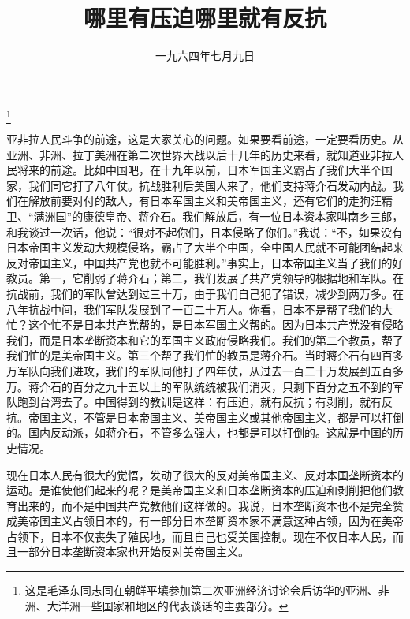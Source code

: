 
\title{哪里有压迫哪里就有反抗}
\date{一九六四年七月九日}
\thanks{这是毛泽东同志同在朝鲜平壤参加第二次亚洲经济讨论会后访华的亚洲、非洲、大洋洲一些国家和地区的代表谈话的主要部分。}
\maketitle


亚非拉人民斗争的前途，这是大家关心的问题。如果要看前途，一定要看历史。从亚洲、非洲、拉丁美洲在第二次世界大战以后十几年的历史来看，就知道亚非拉人民将来的前途。比如中国吧，在十九年以前，日本军国主义霸占了我们大半个国家，我们同它打了八年仗。抗战胜利后美国人来了，他们支持蒋介石发动内战。我们在解放前要对付的敌人，有日本军国主义和美帝国主义，还有它们的走狗汪精卫、“满洲国”的康德皇帝、蒋介石。我们解放后，有一位日本资本家叫南乡三郎，和我谈过一次话，他说：“很对不起你们，日本侵略了你们。”我说：“不，如果没有日本帝国主义发动大规模侵略，霸占了大半个中国，全中国人民就不可能团结起来反对帝国主义，中国共产党也就不可能胜利。”事实上，日本帝国主义当了我们的好教员。第一，它削弱了蒋介石；第二，我们发展了共产党领导的根据地和军队。在抗战前，我们的军队曾达到过三十万，由于我们自己犯了错误，减少到两万多。在八年抗战中间，我们军队发展到了一百二十万人。你看，日本不是帮了我们的大忙？这个忙不是日本共产党帮的，是日本军国主义帮的。因为日本共产党没有侵略我们，而是日本垄断资本和它的军国主义政府侵略我们。我们的第二个教员，帮了我们忙的是美帝国主义。第三个帮了我们忙的教员是蒋介石。当时蒋介石有四百多万军队向我们进攻，我们的军队同他打了四年仗，从过去一百二十万发展到五百多万。蒋介石的百分之九十五以上的军队统统被我们消灭，只剩下百分之五不到的军队跑到台湾去了。中国得到的教训是这样：有压迫，就有反抗；有剥削，就有反抗。帝国主义，不管是日本帝国主义、美帝国主义或其他帝国主义，都是可以打倒的。国内反动派，如蒋介石，不管多么强大，也都是可以打倒的。这就是中国的历史情况。

现在日本人民有很大的觉悟，发动了很大的反对美帝国主义、反对本国垄断资本的运动。是谁使他们起来的呢？是美帝国主义和日本垄断资本的压迫和剥削把他们教育出来的，而不是中国共产党教他们这样做的。我说，日本垄断资本也不是完全赞成美帝国主义占领日本的，有一部分日本垄断资本家不满意这种占领，因为在美帝占领下，日本不仅丧失了殖民地，而且自己也受美国控制。现在不仅日本人民，而且一部分日本垄断资本家也开始反对美帝国主义。

